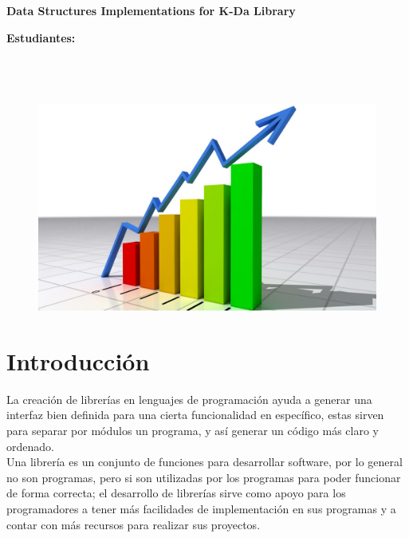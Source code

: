 \documentclass[letterpaper]{article}
\begin{document}
\vspace*{2cm}

\begin{center}
\Huge
\textbf{Data Structures Implementations for K-Da Library}
\vspace*{1cm}
\end{center}

\noindent
\small\baselineskip=14pt
\textbf{Estudiantes:} \\
\\
\\
\\


\begin{figure}[ht]
\includegraphics[width=1\linewidth]{ese.jpg}
\end{figure}


\section{Introducción}
La creación de librerías en lenguajes de programación ayuda a generar una interfaz bien definida para una cierta funcionalidad en específico, 
estas sirven para separar por módulos un programa, y así generar un código más claro y ordenado.\\

Una librería es un conjunto de funciones para desarrollar software, por lo general no son programas, pero si son utilizadas por los programas 
para poder funcionar de forma correcta; el desarrollo de librerías sirve como apoyo para los programadores a tener más facilidades de implementación 
en sus programas y a contar con más recursos para realizar sus proyectos.\\
\end{document}
